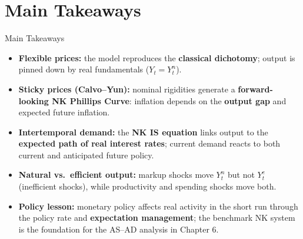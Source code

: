 \documentclass[11pt,aspectratio=169]{beamer}
\begin{document}
\section{Main Takeaways}
\begin{frame}{Main Takeaways}
\small

\begin{itemize}
  \item \textbf{Flexible prices:} the model reproduces the \textbf{classical dichotomy}; output is pinned down by real fundamentals ($Y_t=Y_t^n$).

  \item \textbf{Sticky prices (Calvo--Yun):} nominal rigidities generate a \textbf{forward-looking NK Phillips Curve}:
  inflation depends on the \textbf{output gap} and expected future inflation.

  \item \textbf{Intertemporal demand:} the \textbf{NK IS equation} links output to the \textbf{expected path of real interest rates};
  current demand reacts to both current and anticipated future policy.

  \item \textbf{Natural vs.\ efficient output:} markup shocks move $Y_t^n$ but not $Y_t^e$ (inefficient shocks), while productivity and spending shocks move both.

  \item \textbf{Policy lesson:} monetary policy affects real activity in the short run through the policy rate and \textbf{expectation management}; the benchmark NK system is the foundation for the AS--AD analysis in Chapter 6.
\end{itemize}

\end{frame}

\appendix
\end{document}
